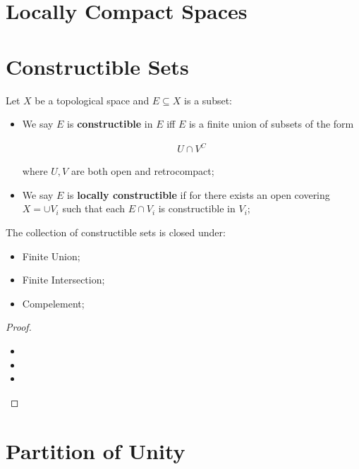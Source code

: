 \documentclass[Total.tex]{subfiles}
\begin{document}
		\section{Locally Compact Spaces}
		\section{Constructible Sets}
		
			\begin{Def}
				Let $X$ be a topological space and $E\subseteq X$ is a subset:
				
				\begin{itemize}
					\item We say $E$ is \textbf{constructible} in $E$ iff $E$ is a finite union of subsets of the form
					
					\begin{gather*}
						U\cap V^C
					\end{gather*}
					
					where $U,V$ are both open and retrocompact;
					
					\item We say $E$ is \textbf{locally constructible} if for there exists an open covering $X=\cup V_i$ such that each $E\cap V_i$ is constructible in $V_i$;
				\end{itemize}
			\end{Def}
			
			\begin{lemma}
				The collection of constructible sets is closed under:
				
				\begin{itemize}
					\item Finite Union;
					\item Finite Intersection;
					\item Compelement;
				\end{itemize}
			\end{lemma}
			
			\begin{proof}
				\begin{itemize}
					\item 
					\item 
					\item 
				\end{itemize}
			\end{proof}
		\section{Partition of Unity}
		
\end{document}
